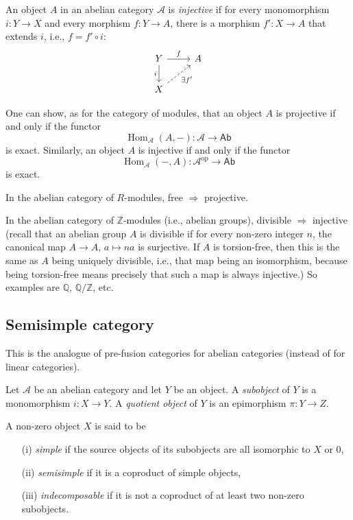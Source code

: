 \documentclass[11pt]{article}
\theoremstyle{definition}
\begin{document}
An object \(A\) in an abelian category \(\mathcal{A}\) is \emph{injective} if for every monomorphism \(i: Y \to X\) and every morphism \(f: Y \to A\), there is a morphism \(f': X \to A\) that extends \(i\), i.e., \(f = f' \circ i\):
\[
\begin{tikzcd}
Y \arrow[r, "f"] \arrow[d, "i"'] & A \\
X \arrow[ur, dashed, swap,"\exists f'"]
\end{tikzcd}
\]

One can show, as for the category of modules, that an object \(A\) is projective if and only if the functor
\[
\operatorname{Hom}_{\mathcal{A}}(A,-) : \mathcal{A} \to \mathsf{Ab}
\]
is exact. Similarly, an object \(A\) is injective if and only if the functor
\[
\operatorname{Hom}_{\mathcal{A}}(-,A) : \mathcal{A}^{\mathrm{op}} \to \mathsf{Ab}
\]
is exact.

In the abelian category of \(R\)-modules, free \(\Rightarrow\) projective.

In the abelian category of \(\mathbb{Z}\)-modules (i.e., abelian groups), divisible \(\Rightarrow\) injective (recall that an abelian group \(A\) is divisible if for every non-zero integer \(n\), the canonical map \(A \to A\), \(a \mapsto na\) is surjective. If \(A\) is torsion-free, then this is the same as \(A\) being uniquely divisible, i.e., that map being an isomorphism, because being torsion-free means precisely that such a map is always injective.) So examples are \(\mathbb{Q}\), \(\mathbb{Q} / \mathbb{Z}\), etc.

\subsection{Semisimple category}
This is the analogue of pre-fusion categories for abelian categories (instead of for linear categories).

Let \( \mathcal{A} \) be an abelian category and let \(Y\) be an object. A \emph{subobject} of \(Y\) is a monomorphism \(i: X \to Y\). A \emph{quotient object} of \(Y\) is an epimorphism \(\pi: Y \to Z\).

A non-zero object \(X\) is said to be
\begin{itemize}
  \item[(i)] \emph{simple} if the source objects of its subobjects are all isomorphic to \(X\) or \(0\),
  \item[(ii)] \emph{semisimple} if it is a coproduct of simple objects,
  \item[(iii)] \emph{indecomposable} if it is not a coproduct of at least two non-zero subobjects.
\end{itemize}
\end{document}
